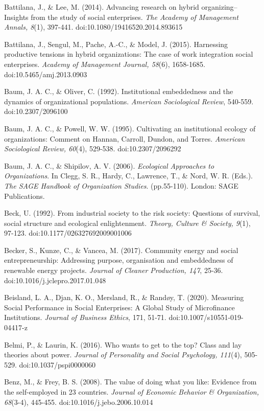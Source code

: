 \documentclass{article}
\begin{document}
Battilana, J., \& Lee, M. (2014). Advancing research on hybrid organizing--Insights from the study of social enterprises. \emph{The Academy of Management Annals, 8}(1), 397-441. doi:10.1080/19416520.2014.893615

Battilana, J., Sengul, M., Pache, A.-C., \& Model, J. (2015). Harnessing productive tensions in hybrid organizations: The case of work integration social enterprises. \emph{Academy of Management Journal, 58}(6), 1658-1685. doi:10.5465/amj.2013.0903

Baum, J. A. C., \& Oliver, C. (1992). Institutional embeddedness and the dynamics of organizational populations. \emph{American Sociological Review}, 540-559. doi:10.2307/2096100

Baum, J. A. C., \& Powell, W. W. (1995). Cultivating an institutional ecology of organizations: Comment on Hannan, Carroll, Dundon, and Torres. \emph{American Sociological Review, 60}(4), 529-538. doi:10.2307/2096292

Baum, J. A. C., \& Shipilov, A. V. (2006). \emph{Ecological Approaches to Organizations}. In Clegg, S. R., Hardy, C., Lawrence, T., \& Nord, W. R. (Eds.). \emph{The SAGE Handbook of Organization Studies}. (pp.55-110). London: SAGE Publications.

Beck, U. (1992). From industrial society to the risk society: Questions of survival, social structure and ecological enlightenment. \emph{Theory, Culture \& Society, 9}(1), 97-123. doi:10.1177/026327692009001006

Becker, S., Kunze, C., \& Vancea, M. (2017). Community energy and social entrepreneurship: Addressing purpose, organisation and embeddedness of renewable energy projects. \emph{Journal of Cleaner Production, 147}, 25-36. doi:10.1016/j.jclepro.2017.01.048

Beisland, L. A., Djan, K. O., Mersland, R., \& Randøy, T. (2020). Measuring Social Performance in Social Enterprises: A Global Study of Microfinance Institutions. \emph{Journal of Business Ethics}, 171, 51-71. doi:10.1007/s10551-019-04417-z

Belmi, P., \& Laurin, K. (2016). Who wants to get to the top? Class and lay theories about power. \emph{Journal of Personality and Social Psychology, 111}(4), 505-529. doi:10.1037/pspi0000060

Benz, M., \& Frey, B. S. (2008). The value of doing what you like: Evidence from the self-employed in 23 countries. \emph{Journal of Economic }\emph{Behavior}\emph{ \& Organization, 68}(3-4), 445-455. doi:10.1016/j.jebo.2006.10.014
\end{document}
